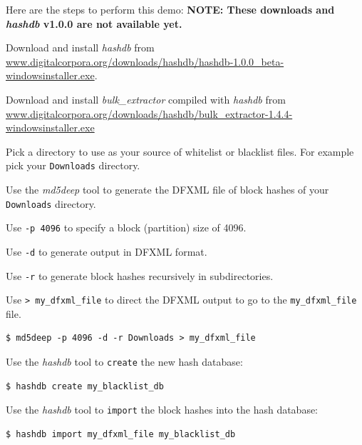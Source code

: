 \documentclass[12pt,twoside]{article}
\newcommand{\hdb}{\emph{hashdb}\xspace}
\newcommand{\bulk}{\emph{bulk\_extractor}\xspace}
\newcommand{\mdd}{\emph{md5deep}\xspace}
\begin{document}
Here are the steps to perform this demo:
\textbf{NOTE: These downloads and \hdb v1.0.0 are not available yet.}
\begin{compactenum}
\item Download and install \hdb from
\url{www.digitalcorpora.org/downloads/hashdb/hashdb-1.0.0\_beta-windowsinstaller.exe}.
\item Download and install \bulk compiled with \hdb from
\url{www.digitalcorpora.org/downloads/hashdb/bulk\_extractor-1.4.4-windowsinstaller.exe}
\item Pick a directory to use as your source of whitelist or blacklist files.
For example pick your \texttt{Downloads} directory.

\item Use the \mdd tool to generate the DFXML file of block hashes
of your \texttt{Downloads} directory.
\begin{compactitem}
\item Use \texttt{-p 4096} to specify a block (partition) size of 4096.
\item Use \texttt{-d} to generate output in DFXML format.
\item Use \texttt{-r} to generate block hashes recursively in subdirectories.
\item Use \texttt{> my\_dfxml\_file} to direct the DFXML output
to go to the \texttt{my\_dfxml\_file} file.
\end{compactitem}
\begin{verbatim}
$ md5deep -p 4096 -d -r Downloads > my_dfxml_file
\end{verbatim}

\item Use the \hdb tool to \texttt{create} the new hash database:
\begin{verbatim}
$ hashdb create my_blacklist_db
\end{verbatim}

\item Use the \hdb tool to \texttt{import} the block hashes
into the hash database:
\begin{verbatim}
$ hashdb import my_dfxml_file my_blacklist_db
\end{verbatim}
\end{compactenum}
\end{document}
